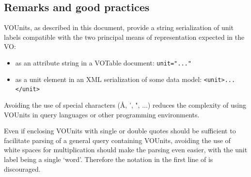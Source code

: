 \documentclass[11pt,notitlepage,onecolumn]{ivoa}
\def\eg{e.g.~}
\begin{document}
%
%
%
%

\subsection{Remarks and good practices}

VOUnits, as described in this document, provide a string serialization of
unit labels compatible with the two principal
means of representation expected in the VO:
\begin{itemize}
\item as an attribute string in a VOTable document: \verb|unit="..."|
\item as a unit element in an XML serialization of some data model: \verb|<unit>...</unit>|
\end{itemize}

Avoiding the use of special characters (\AA, ', ", ...) reduces the
complexity of using VOUnits in query languages or other programming environments.

Even if enclosing VOUnits with single or double quotes should be sufficient to
facilitate parsing of a general query containing VOUnits, avoiding the use of
white spaces for multiplication should
make the parsing even easier, with the unit label being a single `word'. Therefore
the notation in the first line of  is discouraged.
\end{document}
